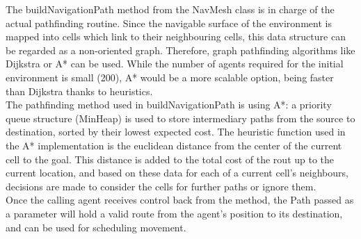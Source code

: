 The buildNavigationPath method from the NavMesh class is in charge of the actual pathfinding routine. Since the navigable surface of the environment is mapped into cells which link to their neighbouring cells, this data structure can be regarded as a non-oriented graph. Therefore, graph pathfinding algorithms like Dijkstra\cite{Dijkstra} or A*\cite{Astar} can be used.  While the number of agents required for the initial environment is small (200), A* would be a more scalable option, being faster than Dijkstra thanks to heuristics.\\
The pathfinding method used in buildNavigationPath is using A*: a priority queue structure (MinHeap) is used to store intermediary paths from the source to destination, sorted by their lowest expected cost. The heuristic function used in the A* implementation is the euclidean distance from the center of the current cell to the goal. This distance is added to the total cost of the rout up to the current location, and based on these data for each of a current cell's neighbours, decisions are made to consider the cells for further paths or ignore them.\\
Once the calling agent receives control back from the method, the Path passed as a parameter will hold a valid route from the agent's position to its destination, and can be used for scheduling movement.

%
%
%
